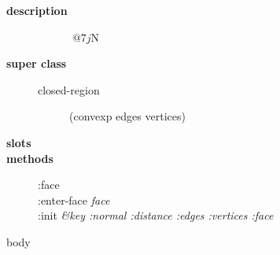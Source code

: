 \begin{description}

\item[{\jlarge \bf description}]\hspace{1cm}
\begin{description}
\item[] $@7j$N%
\end{description}

\item[{\jlarge \bf super class}]\hspace{1cm}
\begin{description}
\item[closed-region] (convexp edges vertices)
\end{description}

\item[{\jlarge \bf slots}]\hspace{1cm}

\item[{\jlarge \bf methods}]\hspace{1cm}
\begin{description}
\item[:face]
\item[:enter-face {\em face}]
\item[:init {\em \&key :normal :distance :edges :vertices :face}]
\end{description}

\end{description}
\vfill
\pagebreak
{\jLarge body}
\\ [0.5cm]
